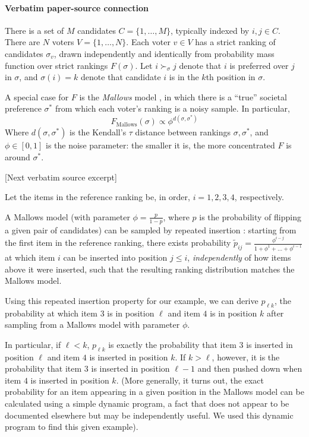 \documentclass[10pt]{article}
\begin{document}
\paragraph{Verbatim paper-source connection}
\begin{ReviewVerbatim}
 There is a set of $M$ candidates $C = \{1,\dots,M\}$, typically indexed by $i,j\in C$. There are $N$ voters $V = \{1,\dots,N\}$. Each voter $v\in V$ has a strict ranking of candidates $\sigma_v$, drawn independently and identically from probability mass function over strict rankings $F(\sigma)$. Let $i \succ_\sigma j$ denote that $i$ is preferred over $j$ in $\sigma$, and $\sigma(i) = k$ denote that candidate $i$ is in the $k$th position in $\sigma$.

A special case for $F$ is the \textit{Mallows} model \cite{mallows1957non}, in which there is a ``true'' societal preference $\sigma^*$ from which each voter's ranking is a noisy sample. In particular,
\[
F_\text{Mallows}(\sigma) \propto {\phi^{d(\sigma, \sigma^*)}}
\]
Where $d(\sigma, \sigma^*)$ is the Kendall's $\tau$ distance between rankings $\sigma, \sigma^*$, and $\phi \in [0,1]$ is the noise parameter: the smaller it is, the more concentrated $F$ is around $\sigma^*$.

[Next verbatim source excerpt]



Let the items in the reference ranking be, in order, $i=1, 2, 3, 4$, respectively.

A Mallows model (with parameter $\phi = \frac{p}{1-p}$, where $p$ is the probability of flipping a given pair of candidates) can be sampled by repeated insertion \citep{lu14a,diaconis_group_nodate}: starting from the first item in the reference ranking, there exists probability $\tilde{p}_{ij} = \frac{\phi^{i-j}}{1 + \phi^1 + \dots + \phi^{i-1}}$ at which item $i$ can be inserted into position $j\leq i$, \textit{independently} of how items above it were inserted, such that the resulting ranking distribution matches the Mallows model.

Using this repeated insertion property for our example, we can derive $p_{\ell k}$, the probability at which item $3$ is in position $\ell$ and item $4$ is in position $k$ after sampling from a Mallows model with parameter $\phi$.

In particular, if $\ell < k$, $p_{\ell k}$ is exactly the probability that item $3$ is inserted in position $\ell$ and item $4$ is inserted in position $k$. If $k>\ell$, however, it is the probability that item $3$ is inserted in position $\ell - 1$ and then pushed down when item $4$ is inserted in position $k$. (More generally, it turns out, the exact probability for an item appearing in a given position in the Mallows model can be calculated using a simple dynamic program, a fact that does not appear to be documented  elsewhere but may be independently useful. We used this dynamic program to find this given example).
\end{ReviewVerbatim}
\end{document}
